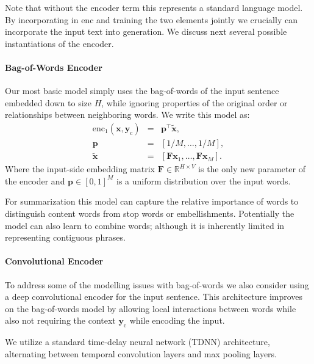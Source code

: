 \documentclass[11pt,a4paper]{article}
\newcommand{\enc}{\mathrm{enc}}
\newcommand{\xvec}{\mathbf{x}}
\newcommand{\context}{\mathbf{y}_{\mathrm{c}}}
\newcommand{\inpcontext}{\mathbf{\tilde{x}}}
\newcommand{\Fvec}{\mathbf{F}}
\newcommand{\reals}{\mathbb{R}}
\begin{document}
Note that without the encoder term this represents a standard language
model. By incorporating in $\enc$ and training the two elements
jointly we crucially can incorporate the input text into
generation. We discuss next several possible instantiations of the
encoder.


\paragraph{Bag-of-Words Encoder}

Our most basic model simply uses the bag-of-words of the input
sentence embedded down to size $H$, while ignoring properties of the
original order or relationships between neighboring words. We write
this model as:
\begin{eqnarray*}
  \enc_1(\xvec, \context) &=&  \mathbf{p}^\top \inpcontext,  \\ 
  \mathbf{p} & =  & [1/M, \ldots, 1/M],   \\ 
  \inpcontext &=& [\Fvec \xvec_1, \dots, \Fvec \xvec_{M}].
\end{eqnarray*}
\noindent Where the input-side embedding matrix $\Fvec \in \reals^{H
  \times V}$ is the only new parameter of the encoder 
 and $\mathbf{p} \in [0,1]^{M}$ is a
uniform distribution over the input words.

For summarization this model can
capture the relative importance of words to distinguish content words
from stop words or embellishments. Potentially the model can also
learn to combine words; although it is inherently limited in
representing contiguous phrases.

\paragraph{Convolutional Encoder}

To address some of the modelling issues with bag-of-words
we also consider using a deep convolutional encoder for the input
sentence. This architecture improves on the bag-of-words model by
allowing local interactions between words while also not requiring the
context $\context$ while encoding the input.

We utilize a standard time-delay neural network (TDNN) architecture,
alternating between temporal convolution layers and max pooling
layers.
\end{document}
